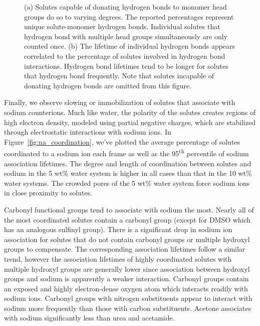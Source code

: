 \documentclass[journal=jpcbfk,manuscript=article]{achemso}
\begin{document}
\begin{figure}[!htb]
\begin{subfigure}{0.45\textwidth}
  \caption{}\label{fig:hbond_dwells}
  \end{subfigure}
  \caption{(a) Solutes capable of donating hydrogen bonds to monomer head groups
  do so to varying degrees. The reported percentages represent unique solute-monomer
  hydrogen bonds. Individual solutes that hydrogen bond with multiple head groups
  simultaneously are only counted once. (b) The lifetime of individual hydrogen
  bonds appears correlated to the percentage of solutes involved in hydrogen bond
  interactions. Hydrogen bond lifetimes tend to be longer for solutes that 
  hydrogen bond frequently. Note that solutes incapable of donating hydrogen
  bonds are omitted from this figure.}\label{fig:hbonds}
  \end{figure}
  
  Finally, we observe slowing or immobilization of solutes that associate with
  sodium counterions. Much like water, the polarity of the solutes creates 
  regions of high electron density, modeled using partial negative charges, 
  which are stabilized through electrostatic interactions with sodium ions. 
  In Figure~\ref{fig:na_coordination}, we've plotted the average percentage
  of solutes coordinated to a sodium ion each frame as well as the
  95\textsuperscript{th} percentile of sodium association lifetimes. The degree and length of 
  coordination between solutes and sodium in the 5 wt\% water system is higher
  in all cases than that in the 10 wt\% water systems. The crowded pores of 
  the 5 wt\% water system force sodium ions in close proximity to solutes. 
  
  Carbonyl functional groups tend to associate with sodium the most. Nearly
  all of the most coordinated solutes contain a carbonyl group (except for 
  DMSO which has an analogous sulfinyl group). There is a significant
  drop in sodium ion association for solutes that do not contain carbonyl 
  groups or multiple hydroxyl groups to compensate. The corresponding association
  lifetimes follow a similar trend, however the association lifetimes of highly coordinated 
  solutes with multiple hydroxyl groups are generally lower since association
  between hydroxyl groups and sodium is apparently a weaker interaction. Carbonyl
  groups contain an exposed and highly electron-dense oxygen atom which interacts
  readily with sodium ions. Carbonyl groups with nitrogen substituents appear
  to interact with sodium more frequently than those with carbon substituents. 
  Acetone associates with sodium significantly less than urea and acetamide. 
\end{document}
